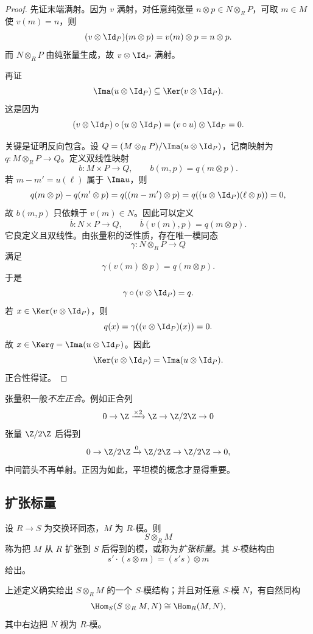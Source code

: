 \begin{proof}
先证末端满射。因为 $v$ 满射，对任意纯张量 $n\otimes p\in N\otimes_R P$，可取 $m\in M$ 使 $v(m)=n$，则
\[
(v\otimes \Id_P)(m\otimes p)=v(m)\otimes p=n\otimes p.
\]
而 $N\otimes_R P$ 由纯张量生成，故 $v\otimes \Id_P$ 满射。

再证
\[
\Ima(u\otimes \Id_P)\subseteq \Ker(v\otimes \Id_P).
\]
这是因为
\[
(v\otimes \Id_P)\circ (u\otimes \Id_P)=(v\circ u)\otimes \Id_P=0.
\]

关键是证明反向包含。设 $Q=(M\otimes_R P)/\Ima(u\otimes \Id_P)$，记商映射为 $q\colon M\otimes_R P\to Q$。定义双线性映射
\[
b\colon M\times P\to Q,
\qquad b(m,p)=q(m\otimes p).
\]
若 $m-m'=u(\ell)$ 属于 $\Ima u$，则
\[
q(m\otimes p)-q(m'\otimes p)=q((m-m')\otimes p)=q((u\otimes \Id_P)(\ell\otimes p))=0,
\]
故 $b(m,p)$ 只依赖于 $v(m)\in N$。因此可以定义
\[
\overline b\colon N\times P\to Q,
\qquad \overline b(v(m),p)=q(m\otimes p).
\]
它良定义且双线性。由张量积的泛性质，存在唯一模同态
\[
\gamma\colon N\otimes_R P\to Q
\]
满足
\[
\gamma(v(m)\otimes p)=q(m\otimes p).
\]
于是
\[
\gamma\circ (v\otimes \Id_P)=q.
\]
若 $x\in \Ker(v\otimes \Id_P)$，则
\[
q(x)=\gamma((v\otimes \Id_P)(x))=0.
\]
故 $x\in \Ker q=\Ima(u\otimes \Id_P)$。因此
\[
\Ker(v\otimes \Id_P)=\Ima(u\otimes \Id_P).
\]
正合性得证。
\end{proof}

\begin{remark}
张量积一般\emph{不左正合}。例如正合列
\[
0\to \Z\xrightarrow{\times 2} \Z\to \Z/2\Z\to 0
\]
张量 $\Z/2\Z$ 后得到
\[
0\to \Z/2\Z\xrightarrow{0} \Z/2\Z\to \Z/2\Z\to 0,
\]
中间箭头不再单射。正因为如此，平坦模的概念才显得重要。
\end{remark}

\subsection{扩张标量}

\begin{definition}
设 $R\to S$ 为交换环同态，$M$ 为 $R$-模。则
\[
S\otimes_R M
\]
称为把 $M$ 从 $R$ 扩张到 $S$ 后得到的模，或称为\emph{扩张标量}。其 $S$-模结构由
\[
s'\cdot (s\otimes m)=(s's)\otimes m
\]
给出。
\end{definition}

\begin{proposition}
上述定义确实给出 $S\otimes_R M$ 的一个 $S$-模结构；并且对任意 $S$-模 $N$，有自然同构
\[
\Hom_S(S\otimes_R M,N)\cong \Hom_R(M,N),
\]
其中右边把 $N$ 视为 $R$-模。
\end{proposition}


